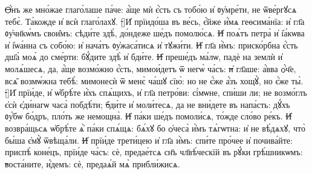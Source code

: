 \st{Ѻ҆́}нъ же мно́жае глаго́лаше па́че: а҆́ще  мѝ є҆́сть съ тобо́ю и҆ ᲂу҆мре́ти, не ѿве́ргꙋсѧ тебє̀. Та́кожде и҆ всѝ глаго́лахꙋ.
\st[]{И҆} прїидо́ша въ ве́сь, є҆́йже и҆́мѧ геѳсима́нїа: и҆ гл҃а ᲂу҆чн҃кѡ́мъ свои̑мъ: сѣди́те здѣ̀, до́ндеже ше́дъ помолю́сѧ.
\st{И҆} поѧ́тъ петра̀ и҆ і҆а́кѡва и҆ і҆ѡа́нна съ собо́ю: и҆ нача́тъ ᲂу҆жаса́тисѧ и҆ тꙋжи́ти.
\st{И҆} гл҃а и҆̀мъ: приско́рбна є҆́сть дш҃а̀ моѧ̀ до сме́рти: бꙋ́дите здѣ̀ и҆ бди́те.
\st{И҆} преше́дъ ма́лѡ, падѐ на землѝ и҆ молѧ́шесѧ, да, а҆́ще возмо́жно є҆́сть, мимои́детъ ѿ негѡ̀ ча́съ:
\st{и҆} гл҃аше: а҆́вва ѻ҆́ч҃е, всѧ̑ возмѡ́жна тебѣ̀: мимонесѝ ѿ менє̀ ча́шꙋ сїю̀: но не є҆́же а҆́зъ хощꙋ̀, но є҆́же ты̀.
\st[]{И҆} прїи́де, и҆ ѡ҆брѣ́те и҆̀хъ спѧ́щихъ, и҆ гл҃а петро́ви: сі́мѡне, спи́ши ли; не возмо́глъ є҆сѝ є҆ди́нагѡ часа̀ побдѣ́ти;
\st{б}ди́те и҆ моли́тесѧ, да не вни́дете въ напа́сть: дꙋ́хъ ᲂу҆́бѡ бо́дръ, пло́ть же немощна̀.
\st{И҆} па́ки ше́дъ помоли́сѧ, то́жде сло́во ре́къ.
\st{И҆} возвра́щьсѧ ѡ҆брѣ́те ѧ҆̀ па́ки спѧ́щѧ: бѧ́хꙋ бо ѻ҆чеса̀ и҆̀мъ тѧ́гѡтна: и҆ не вѣ́дѧхꙋ, что̀ бы́ша є҆мꙋ̀ ѿвѣща́ли.
\st{И҆} прїи́де трети́цею и҆ гл҃а и҆̀мъ: спи́те про́чее и҆ почива́йте: приспѣ̀ коне́цъ, прїи́де ча́съ: сѐ, предае́тсѧ сн҃ъ чл҃вѣ́ческїй въ рꙋ́ки грѣ́шникѡмъ:
\st{в}оста́ните, и҆́демъ: сѐ, предаѧ́й мѧ̀ прибли́жисѧ.
%
